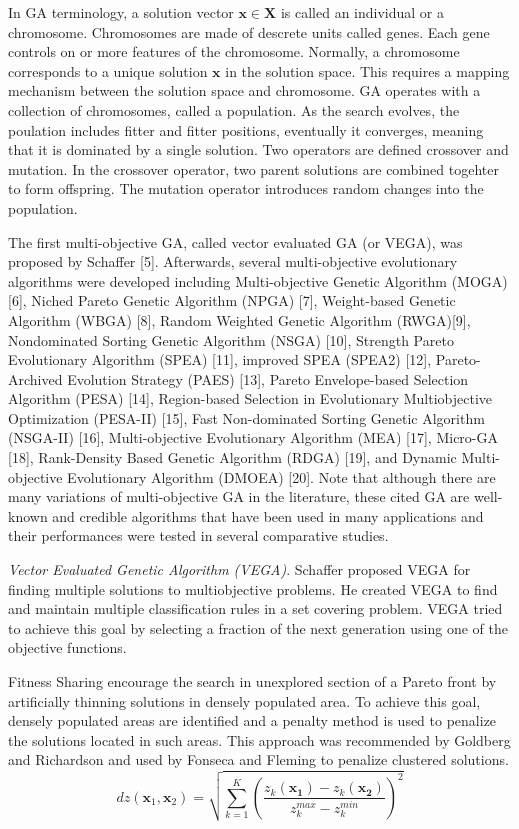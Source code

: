 In GA terminology, a solution vector $\bm{x}\in\bm{X}$ is called an individual or a chromosome.  Chromosomes are made of descrete units called genes.  Each gene controls on or more features of the chromosome.  Normally, a chromosome corresponds to a unique solution $\bm{x}$ in the solution space.  This requires a mapping mechanism between the solution space and chromosome.  GA operates with a collection of chromosomes, called a population.  As the search evolves, the poulation includes fitter and fitter positions, eventually it converges, meaning that it is dominated by a single solution.  Two operators are defined crossover and mutation.  In the crossover operator, two parent solutions are combined togehter to form offspring.  The mutation operator introduces random changes into the population.

The first multi-objective GA, called vector evaluated GA (or VEGA), was proposed by Schaffer [5]. Afterwards, several multi-objective evolutionary algorithms were developed including Multi-objective Genetic Algorithm (MOGA) [6], Niched Pareto Genetic Algorithm (NPGA) [7], Weight-based Genetic Algorithm (WBGA) [8], Random Weighted Genetic Algorithm (RWGA)[9], Nondominated Sorting Genetic Algorithm (NSGA) [10], Strength Pareto Evolutionary Algorithm (SPEA) [11], improved SPEA (SPEA2) [12], Pareto-Archived Evolution Strategy (PAES) [13], Pareto Envelope-based Selection Algorithm (PESA) [14], Region-based Selection in Evolutionary Multiobjective Optimization (PESA-II) [15], Fast Non-dominated Sorting Genetic Algorithm (NSGA-II) [16], Multi-objective Evolutionary Algorithm (MEA) [17], Micro-GA [18], Rank-Density Based Genetic Algorithm (RDGA) [19], and Dynamic Multi-objective Evolutionary Algorithm (DMOEA) [20]. Note that although there are many variations of multi-objective GA in the literature, these cited GA are well-known and credible algorithms that have been used in many applications and their performances were tested in several comparative studies.



\emph{Vector Evaluated Genetic Algorithm (VEGA)}.  Schaffer proposed VEGA for finding multiple solutions to multiobjective problems.  He created VEGA to find and maintain multiple classification rules in a set covering problem.  VEGA tried to achieve this goal by selecting a fraction of the next generation using one of the objective functions.

Fitness Sharing encourage the search in unexplored section of a Pareto front by artificially thinning solutions in densely populated area.  To achieve this goal, densely populated areas are identified and a penalty method is used to penalize the solutions located in such areas.  This approach was recommended by Goldberg and Richardson\cite{goldberg1987genetic} and used by Fonseca and Fleming\cite{fonseca1993multiobjective} to penalize clustered solutions.
\begin{equation}
    dz(\bm{x}_1,\bm{x}_2)
    = \sqrt{\sum_{k=1}^{K}  \left(\frac{z_k(\bm{x_1})-z_k(\bm{x_2})}
                                       {z_{k}^{max}-z_{k}^{min}}
                            \right)^{2}
      }
\end{equation}

